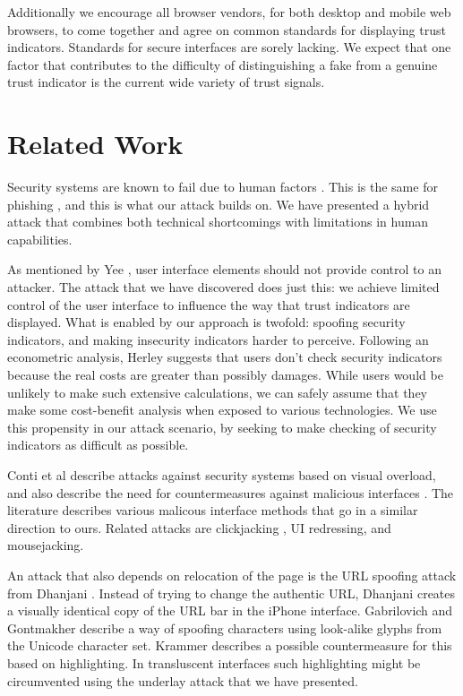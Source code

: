 \documentclass[twoside,letterpaper]{soups}
\begin{document}
Additionally we encourage all browser vendors, for both desktop and mobile web browsers, to come together and agree on common standards for displaying trust indicators. Standards for secure interfaces are sorely lacking. We expect that one factor that contributes to the difficulty of distinguishing a fake from a genuine trust indicator is the current wide variety of trust signals. %

\section{Related Work}

Security systems are known to fail due to human factors \cite{fail}. This is the same for phishing \cite{Dhamija:2006:WPW:1124772.1124861}, and this is what our attack builds on. We have presented a hybrid attack that combines both technical shortcomings with limitations in human capabilities.

As mentioned by Yee \cite{yee2005guidelines}, user interface elements should not provide control to an attacker. The attack that we have discovered does just this: we achieve limited control of the user interface to influence the way that trust indicators are displayed. What is enabled by our approach is twofold: spoofing security indicators, and making insecurity indicators harder to perceive. Following an econometric analysis, Herley \cite{externalities} suggests that users don't check security indicators because the real costs are greater than possibly damages. While users would be unlikely to make such extensive calculations, we can safely assume that they make some cost-benefit analysis when exposed to various technologies. We use this propensity in our attack scenario, by seeking to make checking of security indicators as difficult as possible.

Conti et al \cite{overload} describe attacks against security systems based on visual overload, and also describe the need for countermeasures against malicious interfaces \cite{conti2010malicious}. The literature describes various malicous interface methods that go in a similar direction to ours. Related attacks are clickjacking \cite{huang2012clickjacking}, UI redressing, and mousejacking.

An attack that also depends on relocation of the page is the URL spoofing attack from Dhanjani \cite{iphone}. Instead of trying to change the authentic URL, Dhanjani creates a visually identical copy of the URL bar in the iPhone interface. Gabrilovich and Gontmakher \cite{gabrilovich2002homograph} describe a way of spoofing characters using look-alike glyphs from the Unicode character set. Krammer \cite{Krammer:2006:PDA:1501434.1501473} describes a possible countermeasure for this based on highlighting. In transluscent interfaces such highlighting might be circumvented using the underlay attack that we have presented.
\end{document}

